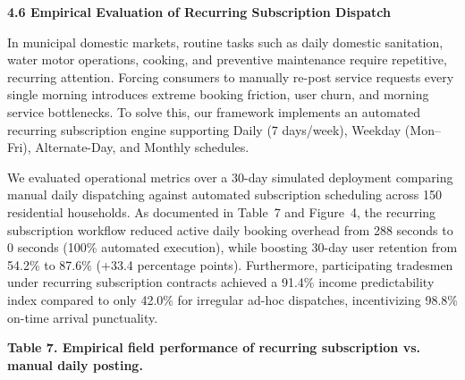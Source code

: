 \documentclass[10pt,twocolumn,a4paper]{article}
\begin{document}
\vspace{0.8em}
\noindent
\textbf{4.6 Empirical Evaluation of Recurring Subscription Dispatch}

In municipal domestic markets, routine tasks such as daily domestic sanitation, water motor operations, cooking, and preventive maintenance require repetitive, recurring attention. Forcing consumers to manually re-post service requests every single morning introduces extreme booking friction, user churn, and morning service bottlenecks. To solve this, our framework implements an automated recurring subscription engine supporting Daily (7 days/week), Weekday (Mon--Fri), Alternate-Day, and Monthly schedules.

We evaluated operational metrics over a 30-day simulated deployment comparing manual daily dispatching against automated subscription scheduling across 150 residential households. As documented in Table~7 and Figure~4, the recurring subscription workflow reduced active daily booking overhead from 288 seconds to 0 seconds (100\% automated execution), while boosting 30-day user retention from 54.2\% to 87.6\% (+33.4 percentage points). Furthermore, participating tradesmen under recurring subscription contracts achieved a 91.4\% income predictability index compared to only 42.0\% for irregular ad-hoc dispatches, incentivizing 98.8\% on-time arrival punctuality.

\vspace{0.8em}
\noindent
\textbf{Table 7. Empirical field performance of recurring subscription vs. manual daily posting.}
\vspace{0.3em}

\noindent
{}
\end{document}
